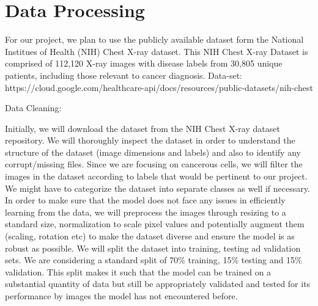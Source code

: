 \documentclass{article}
\begin{document}
\section{Data Processing}
For our project, we plan to use the publicly available dataset form the National Institues of Health (NIH) Chest X-ray dataset. This NIH Chest X-ray Dataset is comprised of 112,120 X-ray images with disease labels from 30,805 unique patients, including those relevant to cancer diagnosis.
Data-set: https://cloud.google.com/healthcare-api/docs/resources/public-datasets/nih-chest

Data Cleaning:

Initially, we will download the dataset from the NIH Chest X-ray dataset repository. We will thoroughly inspect the dataset in order to understand the structure of the dataset (image dimensions and labels) and also to identify any corrupt/missing files.
Since we are focusing on cancerous cells, we will filter the images in the dataset according to labels that would be pertinent to our project. We might have to categorize the dataset into separate classes as well if necessary.
In order to make sure that the model does not face any issues in efficiently learning from the data, we will preprocess the images through resizing to a standard size, normalization to scale pixel values and potentially augment them (scaling, rotation etc) to make the dataset diverse and ensure the model is as robust as possible.
We will split the dataset into training, testing ad validation sets. We are considering a standard split of 70\% training, 15\% testing and 15\% validation. This split makes it such that the model can be trained on a substantial quantity of data but still be appropriately validated and tested for its performance by images the model has not encountered before.
\end{document}
